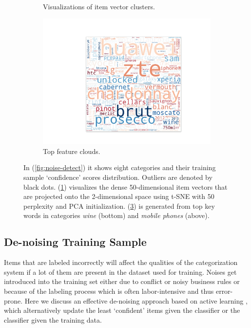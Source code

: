 \begin{figure}
\begin{subfigure}[b]{0.33\textwidth}
   \caption{Visualizations of item vector clusters.  }
   \label{fig:cluster}
\end{subfigure}
\begin{subfigure}[b]{0.3\textwidth}
   \includegraphics[width=\textwidth]{resources/wc}
   \caption{Top feature clouds.}
   \label{fig:wc}
\end{subfigure}
\caption{In (\ref{fig:noise-detect}) it shows eight categories and their training sample `confidence' scores distribution. Outliers are denoted by black dots. (\ref{fig:cluster}) visualizes the dense 50-dimensional item vectors that are projected onto the 2-dimensional space using t-SNE with 50 perplexity and PCA initialization. (\ref{fig:wc}) is generated from top key words in categories \emph{wine} (bottom) and \emph{mobile phones} (above).}
\end{figure}

\subsection{De-noising Training Sample} %
\label{sub:de_noising_training_sample}

Items that are labeled incorrectly will affect the qualities of the categorization system if a lot of them are present in the dataset used for training. Noises get introduced into the training set either due to conflict or noisy business rules or because of the labeling process which is often labor-intensive and thus error-prone. Here we discuss an effective de-noising approach based on active learning \cite{culotta2005reducing}, which alternatively update the least `confident' items given the classifier or the classifier given the training data.



